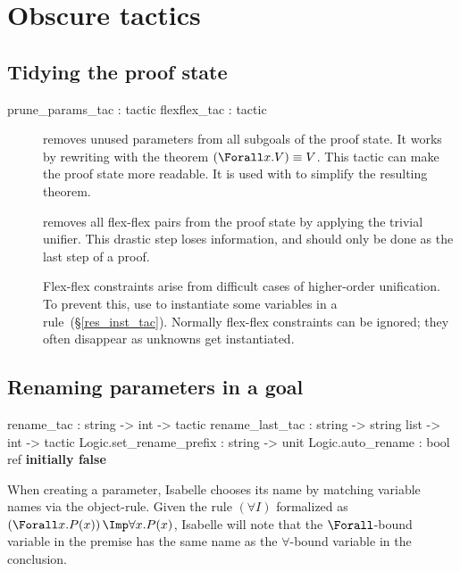 \section{Obscure tactics}
\subsection{Tidying the proof state}
\begin{ttbox} 
prune_params_tac : tactic
flexflex_tac     : tactic
\end{ttbox}
\begin{description}
\item[]  
  removes unused parameters from all subgoals of the proof state.  It works
  by rewriting with the theorem $(\Forall x. V)\equiv V$.  This tactic can
  make the proof state more readable.  It is used with
   to simplify the resulting theorem.

\item[]  
  removes all flex-flex pairs from the proof state by applying the trivial
  unifier.  This drastic step loses information, and should only be done as
  the last step of a proof.

  Flex-flex constraints arise from difficult cases of higher-order
  unification.  To prevent this, use  to instantiate
  some variables in a rule~(\S\ref{res_inst_tac}).  Normally flex-flex
  constraints can be ignored; they often disappear as unknowns get
  instantiated.
\end{description}


\subsection{Renaming parameters in a goal} 
\begin{ttbox} 
rename_tac        : string -> int -> tactic
rename_last_tac   : string -> string list -> int -> tactic
Logic.set_rename_prefix : string -> unit
Logic.auto_rename       : bool ref      \hfill{\bf initially false}
\end{ttbox}
When creating a parameter, Isabelle chooses its name by matching variable
names via the object-rule.  Given the rule $(\forall I)$ formalized as
$\left(\Forall x. P(x)\right) \Imp \forall x.P(x)$, Isabelle will note that
the $\Forall$-bound variable in the premise has the same name as the
$\forall$-bound variable in the conclusion.  

